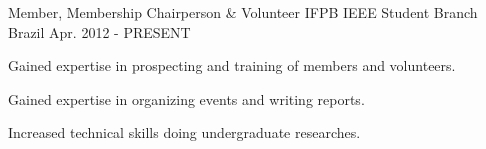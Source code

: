 \begin{cventries}
  \cventry
    {Member, Membership Chairperson \& Volunteer} %
    {IFPB IEEE Student Branch} %
    {Brazil} %
    {Apr. 2012 - PRESENT} %
    {
      \begin{cvitems} %
        \item {Gained expertise in prospecting and training of members and volunteers.}
        \item {Gained expertise in organizing events and writing reports.}
        \item {Increased technical skills doing undergraduate researches.}
      \end{cvitems}
    }

\end{cventries}
